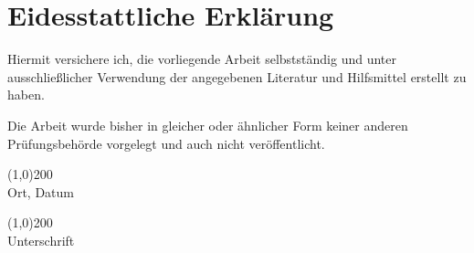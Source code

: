 \chapter*{Eidesstattliche Erklärung}
Hiermit versichere ich, die vorliegende Arbeit selbstständig und unter ausschließlicher Verwendung der angegebenen Literatur und Hilfsmittel erstellt zu haben.

Die Arbeit wurde bisher in gleicher oder ähnlicher Form keiner anderen Prüfungsbehörde vorgelegt und auch nicht veröffentlicht.
\vspace{5cm}
\begin{flushleft}
\line(1,0){200}\\
Ort, Datum\\
\vspace{2cm}

\line(1,0){200}\\
Unterschrift
\end{flushleft}